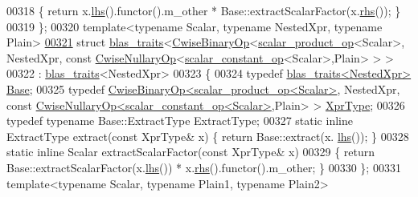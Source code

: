 \begin{DoxyCode}
00318   \{ \textcolor{keywordflow}{return} x.\hyperlink{group___core___module_a0f73e7585dfb54d41c1983e1e6a4b269}{lhs}().functor().m\_other * Base::extractScalarFactor(x.\hyperlink{group___core___module_a3a61cbdf6d1adaa62f012045b04b6d09}{rhs}()); \}
00319 \};
00320 \textcolor{keyword}{template}<\textcolor{keyword}{typename} Scalar, \textcolor{keyword}{typename} NestedXpr, \textcolor{keyword}{typename} Plain>
\hyperlink{struct_eigen_1_1internal_1_1blas__traits_3_01_cwise_binary_op_3_01scalar__product__op_3_01_scala947462575c60123595df86e5556ae031}{00321} \textcolor{keyword}{struct }\hyperlink{struct_eigen_1_1internal_1_1blas__traits}{blas\_traits}<\hyperlink{group___core___module_class_eigen_1_1_cwise_binary_op}{CwiseBinaryOp}<\hyperlink{struct_eigen_1_1internal_1_1scalar__product__op}{scalar\_product\_op}<Scalar>, 
      NestedXpr, const \hyperlink{group___core___module_class_eigen_1_1_cwise_nullary_op}{CwiseNullaryOp}<\hyperlink{struct_eigen_1_1internal_1_1scalar__constant__op}{scalar\_constant\_op}<Scalar>,Plain> > >
00322  : \hyperlink{struct_eigen_1_1internal_1_1blas__traits}{blas\_traits}<NestedXpr>
00323 \{
00324   \textcolor{keyword}{typedef} \hyperlink{struct_eigen_1_1internal_1_1blas__traits}{blas\_traits<NestedXpr>} \hyperlink{struct_eigen_1_1internal_1_1blas__traits}{Base};
00325   \textcolor{keyword}{typedef} \hyperlink{group___core___module_class_eigen_1_1_cwise_binary_op}{CwiseBinaryOp<scalar\_product\_op<Scalar>}, NestedXpr, \textcolor{keyword}{const} 
      \hyperlink{group___core___module_class_eigen_1_1_cwise_nullary_op}{CwiseNullaryOp<scalar\_constant\_op<Scalar>},Plain> > 
      \hyperlink{group___core___module_class_eigen_1_1_cwise_binary_op}{XprType};
00326   \textcolor{keyword}{typedef} \textcolor{keyword}{typename} Base::ExtractType ExtractType;
00327   \textcolor{keyword}{static} \textcolor{keyword}{inline} ExtractType extract(\textcolor{keyword}{const} XprType& x) \{ \textcolor{keywordflow}{return} Base::extract(x.
      \hyperlink{group___core___module_a0f73e7585dfb54d41c1983e1e6a4b269}{lhs}()); \}
00328   \textcolor{keyword}{static} \textcolor{keyword}{inline} Scalar extractScalarFactor(\textcolor{keyword}{const} XprType& x)
00329   \{ \textcolor{keywordflow}{return} Base::extractScalarFactor(x.\hyperlink{group___core___module_a0f73e7585dfb54d41c1983e1e6a4b269}{lhs}()) * x.\hyperlink{group___core___module_a3a61cbdf6d1adaa62f012045b04b6d09}{rhs}().functor().m\_other; \}
00330 \};
00331 \textcolor{keyword}{template}<\textcolor{keyword}{typename} Scalar, \textcolor{keyword}{typename} Plain1, \textcolor{keyword}{typename} Plain2>

\end{DoxyCode}
